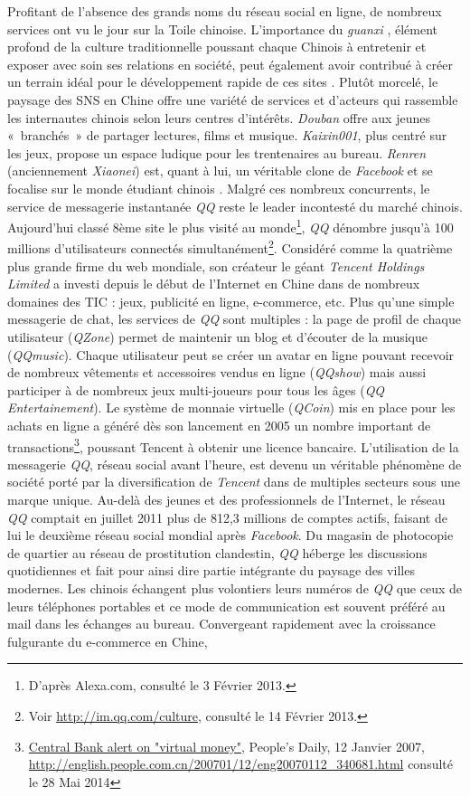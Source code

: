 Profitant de l’absence des grands noms du réseau social en ligne, de nombreux services ont vu le jour sur la Toile chinoise. L'importance du \textit{guanxi} \citep{Yu2008}, élément profond de la culture traditionnelle poussant chaque Chinois à entretenir et exposer avec soin ses relations en société, peut également avoir contribué à créer un terrain idéal pour le développement rapide de ces sites \citep{Yang2011b}. Plutôt morcelé, le paysage des SNS en Chine offre une variété de services et d’acteurs qui rassemble les internautes chinois selon leurs centres d'intérêts. \textit{Douban} offre aux jeunes « branchés » de partager lectures, films et musique. \textit{Kaixin001}, plus centré sur les jeux, propose un espace ludique pour les trentenaires au bureau. \textit{Renren} (anciennement \textit{Xiaonei}) est, quant à lui, un véritable clone de \textit{Facebook} et se focalise sur le monde étudiant chinois \citep{Renaud2011}. Malgré ces nombreux concurrents, le service de messagerie instantanée \textit{QQ} reste le leader incontesté du marché chinois. Aujourd’hui classé 8ème site le plus visité au monde\footnote{D’après Alexa.com, consulté le 3 Février 2013.}, \textit{QQ} dénombre jusqu’à 100 millions d’utilisateurs connectés simultanément\footnote{Voir \url{http://im.qq.com/culture}, consulté le 14 Février 2013.}. Considéré comme la quatrième plus grande firme du web mondiale, son créateur le géant \textit{Tencent Holdings Limited} a investi depuis le début de l’Internet en Chine dans de nombreux domaines des TIC : jeux, publicité en ligne, e-commerce, etc. Plus qu’une simple messagerie de chat, les services de \textit{QQ} sont multiples : la page de profil de chaque utilisateur (\textit{QZone}) permet de maintenir un blog et d’écouter de la musique (\textit{QQmusic}). Chaque utilisateur peut se créer un avatar en ligne pouvant recevoir de nombreux vêtements et accessoires vendus en ligne (\textit{QQshow}) mais aussi participer à de nombreux jeux multi-joueurs pour tous les âges (\textit{QQ Entertainement}). Le système de monnaie virtuelle (\textit{QCoin}) mis en place pour les achats en ligne a généré dès son lancement en 2005 un nombre important de transactions\footnote{\url{Central Bank alert on "virtual money"}, People’s Daily, 12 Janvier 2007, \url{http://english.people.com.cn/200701/12/eng20070112_340681.html} consulté le 28 Mai 2014}, poussant Tencent à obtenir une licence bancaire. L’utilisation de la messagerie \textit{QQ}, réseau social avant l’heure, est devenu un véritable phénomène de société porté par la diversification de \textit{Tencent} dans de multiples secteurs sous une marque unique. Au-delà des jeunes et des professionnels de l’Internet, le réseau \textit{QQ} comptait en juillet 2011 plus de 812,3 millions de comptes actifs, faisant de lui le deuxième réseau social mondial après \textit{Facebook}. Du magasin de photocopie de quartier au réseau de prostitution clandestin, \textit{QQ} héberge les discussions quotidiennes et fait pour ainsi dire partie intégrante du paysage des villes modernes. Les chinois échangent plus volontiers leurs numéros de \textit{QQ} que ceux de leurs téléphones portables et ce mode de communication est souvent préféré au mail dans les échanges au bureau. Convergeant rapidement avec la croissance fulgurante du e-commerce en Chine, 